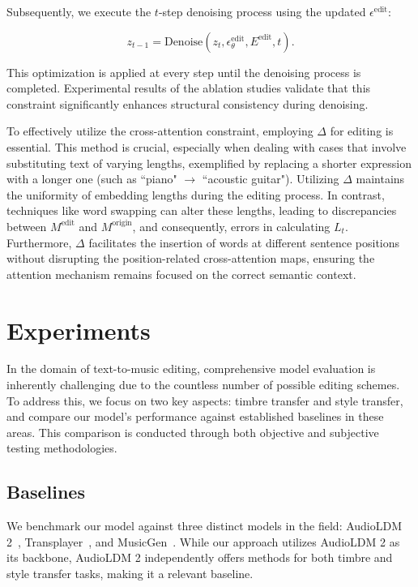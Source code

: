 Subsequently, we execute the $t$-step denoising process using the updated $\epsilon^\text{edit}$:

\begin{equation}
    z_{t-1} = \text{Denoise}(z_t, \epsilon^\text{edit}_\theta, E^\text{edit}, t).
\end{equation}

\noindent This optimization is applied at every step until the denoising process is completed. Experimental results of the ablation studies validate that this constraint significantly enhances structural consistency during denoising.

To effectively utilize the cross-attention constraint, employing $\Delta$ for editing is essential. This method is crucial, especially when dealing with cases that involve substituting text of varying lengths, exemplified by replacing a shorter expression with a longer one (such as ``piano" $\rightarrow$ ``acoustic guitar"). Utilizing $\Delta$ maintains the uniformity of embedding lengths during the editing process. In contrast, techniques like word swapping can alter these lengths, leading to discrepancies between $M^\text{edit}$ and $M^\text{origin}$, and consequently, errors in calculating $L_t$. Furthermore, $\Delta$ facilitates the insertion of words at different sentence positions without disrupting the position-related cross-attention maps, ensuring the attention mechanism remains focused on the correct semantic context.

\section{Experiments}

In the domain of text-to-music editing, comprehensive model evaluation is inherently challenging due to the countless number of possible editing schemes. To address this, we focus on two key aspects: timbre transfer and style transfer, and compare our model's performance against established baselines in these areas. This comparison is conducted through both objective and subjective testing methodologies. 

\subsection{Baselines}

We benchmark our model against three distinct models in the field: AudioLDM 2~\cite{audioldm2}, Transplayer~\cite{transplayer}, and MusicGen~\cite{musicgen}. While our approach utilizes AudioLDM 2 as its backbone, AudioLDM 2 independently offers methods for both timbre and style transfer tasks, making it a relevant baseline.

